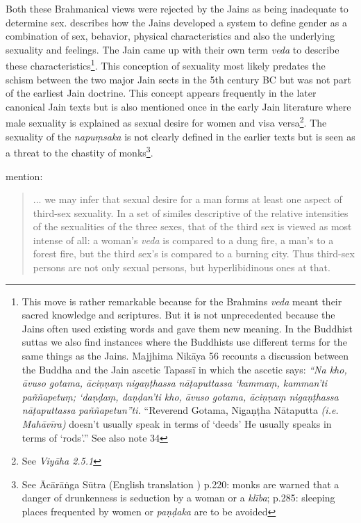 Both these Brahmanical views were rejected by the Jains as being inadequate to determine sex. \cite{dundas} describes how the Jains developed a system to define gender as a combination of sex, behavior, physical characteristics and also the underlying sexuality and feelings. The Jain came up with their own term {\em veda} to describe these characteristics\footnote{This move is rather remarkable because for the Brahmins {\em veda} meant their sacred knowledge and scriptures. But it is not unprecedented because the Jains often used existing words and gave them new meaning. In the Buddhist suttas we also find instances where the Buddhists use different terms for the same things as the Jains. Majjhima Nikāya 56 recounts a discussion between the Buddha and the Jain ascetic Tapassī in which the ascetic says: {\em “Na kho, āvuso gotama, āciṇṇaṃ nigaṇṭhassa nāṭaputtassa ‘kammaṃ, kamman’ti paññapetuṃ; ‘daṇḍaṃ, daṇḍan’ti kho, āvuso gotama, āciṇṇaṃ nigaṇṭhassa nāṭaputtassa paññapetun”ti.} “Reverend Gotama, Nigaṇṭha Nātaputta {\em (i.e. Mahāvīra)} doesn’t usually speak in terms of ‘deeds’ He usually speaks in terms of ‘rods’.” See also \cite{zwilling} note 34}. This conception of sexuality most likely predates the schism between the two major Jain sects in the 5th century BC but was not part of the earliest Jain doctrine. This concept appears frequently in the later canonical Jain texts but is also mentioned once in the early Jain literature where male sexuality is explained as sexual desire for women and visa versa\footnote{See {\em Viyāha 2.5.1}}. The sexuality of the {\em napuṃsaka} is not clearly defined in the earlier texts but is seen as a threat to the chastity of monks\footnote{See Ācārāṅga Sūtra (English translation \cite{jacobi}) p.220: monks are warned that a danger of drunkenness is seduction by a woman or a {\em klība}; p.285: sleeping places frequented by women or {\em paṇḍaka} are to be avoided}.

\cite{zwilling} mention:

\begin{quote}
... we may infer that sexual desire for a man forms at least one aspect of third-sex sexuality. In a set of similes descriptive of the relative intensities of the sexualities of the three sexes, that of the third sex is viewed as most intense of all: a woman's {\em veda} is compared to a dung fire, a man's to a forest fire, but the third sex's is compared to a burning city. Thus third-sex persons are not only sexual persons, but hyperlibidinous ones at that.
\end{quote}

